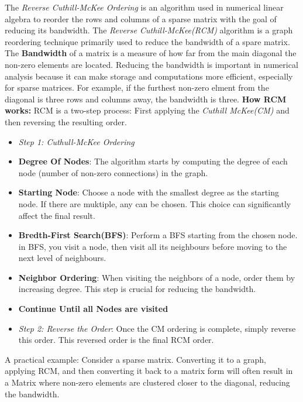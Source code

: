 \documentclass[unicode,11pt,a4paper,oneside,numbers=endperiod,openany]{scrartcl}
\begin{document}
The \textit{Reverse Cuthill-McKee Ordering} is an algorithm used in numerical linear algebra to reorder the rows and columns of a sparse matrix with the goal of reducing its bandwidth.
\newline \newline
The \textit{Reverse Cuthill-McKee(RCM)} algorithm is a graph reordering technique primarily used to reduce the bandwidth of a spare matrix. \newline
The \textbf{Bandwidth} of a matrix is a measure of how far from the main diagonal the non-zero elements are located. Reducing the bandwidth is important in numerical analysis because it can make storage and computations more efficient, especially for sparse matrices. For example, if the furthest non-zero elment from the diagonal is three rows and columns away, the bandwidth is three.
\newline\newline
\textbf{How RCM works:}\newline
RCM is a two-step process: First applying the \textit{Cuthill McKee(CM)} and then reversing the resulting order.
\newline
\begin{itemize}
\item{\textit{Step 1: Cuthull-McKee Ordering}}
 \item {\textbf{Degree Of Nodes}: The algorithm starts by computing the degree of each node (number of non-zero connections) in the graph.}
 \item {\textbf{Starting Node}: Choose a node with the smallest degree as the starting node. If there are muktiple, any can be chosen. This choice can significantly affect the final result.}
 \item{\textbf{Bredth-First Search(BFS)}: Perform a BFS starting from the chosen node. in BFS, you visit a node, then visit all its neighbours before moving to the next level of neighbours.}
 \item{\textbf{Neighbor Ordering}: When visiting the neighbors of a node, order them by increasing degree. This step is crucial for reducing the bandwidth.}
 \item{\textbf{Continue Until all Nodes are visited}}
 \item{\textit{Step 2: Reverse the Order}: \newline Once the CM ordering is complete, simply reverse this order. This reversed order is the final RCM order.}
\end{itemize}

 A practical example:\newline
 Consider a sparse matrix. Converting it to a graph, applying RCM, and then converting it back to a matrix form will often result in a Matrix where non-zero elements are clustered closer to the diagonal, reducing the bandwidth.
\end{document}
